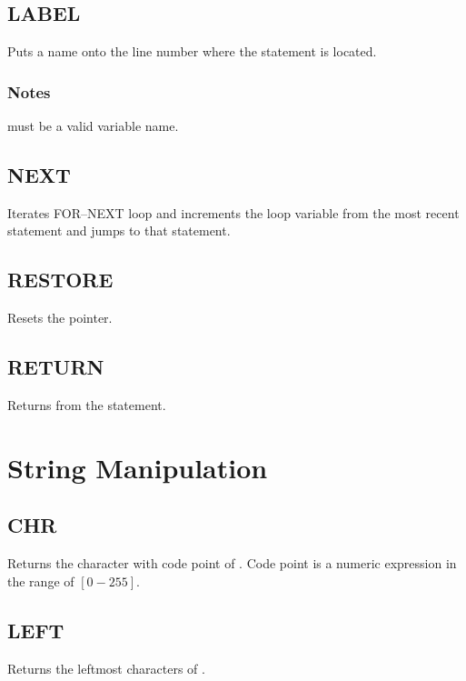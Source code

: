     \subsection{LABEL}
        \par
        Puts a name onto the line number where the statement is located.
        \subsubsection*{Notes}
        \begin{itemlist}
        \item {} must be a valid variable name.
        \end{itemlist}
    \subsection{NEXT}
        \par
        Iterates FOR--NEXT loop and increments the loop variable from the most recent  statement and jumps to that statement.
    \subsection{RESTORE}
        \par
        Resets the  pointer.
    \subsection{RETURN}
        \par
        Returns from the  statement.

\section{String Manipulation}

    \subsection{CHR}
        \par
        Returns the character with code point of . Code point is a numeric expression in the range of $[0-255]$.
    \subsection{LEFT}
        \par
        Returns the leftmost  characters of .

